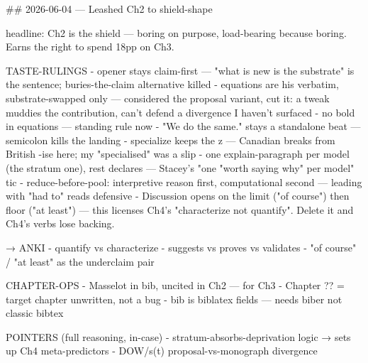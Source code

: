 ## 2026-06-04 — Leashed Ch2 to shield-shape

headline: Ch2 is the shield — boring on purpose, load-bearing because boring. Earns the right to spend 18pp on Ch3.

TASTE-RULINGS
- opener stays claim-first — "what is new is the substrate" is the sentence; buries-the-claim alternative killed
- equations are his verbatim, substrate-swapped only — considered the proposal variant, cut it: a tweak muddies the contribution, can't defend a divergence I haven't surfaced
- no bold in equations — standing rule now
- "We do the same." stays a standalone beat — semicolon kills the landing
- specialize keeps the z — Canadian breaks from British -ise here; my "specialised" was a slip
- one explain-paragraph per model (the stratum one), rest declares — Stacey's "one "worth saying why" per model" tic
- reduce-before-pool: interpretive reason first, computational second — leading with "had to" reads defensive
- Discussion opens on the limit ("of course") then floor ("at least") — this licenses Ch4's "characterize not quantify". Delete it and Ch4's verbs lose backing.

→ ANKI
- quantify vs characterize
- suggests vs proves vs validates
- "of course" / "at least" as the underclaim pair

CHAPTER-OPS
- Masselot in bib, uncited in Ch2 — for Ch3
- Chapter ?? = target chapter unwritten, not a bug
- bib is biblatex fields — needs biber not classic bibtex

POINTERS (full reasoning, in-case)
- stratum-absorbs-deprivation logic → sets up Ch4 meta-predictors
- DOW/s(t) proposal-vs-monograph divergence